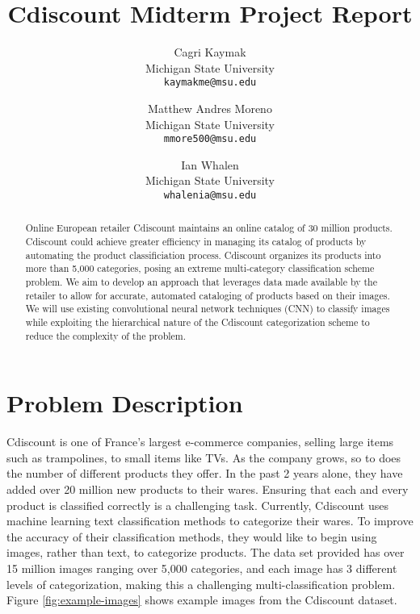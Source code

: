 \documentclass[10pt,twocolumn,letterpaper]{article}
\begin{document}
\title{Cdiscount Midterm Project Report}

\author{Cagri Kaymak\\
Michigan State University \\
{\tt\small kaymakme@msu.edu}
\and
Matthew Andres Moreno\\
Michigan State University\\
{\tt\small mmore500@msu.edu}
\and
Ian Whalen\\
Michigan State University \\
{\tt\small whalenia@msu.edu}
}


\maketitle

\begin{abstract}
Online European retailer Cdiscount maintains an online catalog of 30 million products.
Cdiscount could achieve greater efficiency in managing its catalog of products by automating the product classificiation process. 
Cdiscount organizes its products into more than 5,000 categories, posing an extreme multi-category classification scheme problem.
We aim to develop an approach that leverages data made available by the retailer to allow for accurate, automated cataloging of products based on their images.
We will use existing convolutional neural network techniques (CNN) to classify images while exploiting the hierarchical nature of the Cdiscount categorization scheme to reduce the complexity of the problem.
\end{abstract}

\section{Problem Description}


Cdiscount is one of France's largest e-commerce companies, selling large items such as trampolines, to small items like TVs.
As the company grows, so to does the number of different products they offer.
In the past 2 years alone, they have added over 20 million new products to their wares\cite{cDiscountKaggle}. 
Ensuring that each and every product is classified correctly is a challenging task.
Currently, Cdiscount uses machine learning text classification methods to categorize their wares.
To improve the accuracy of their classification methods, they would like to begin using images, rather than text, to categorize products.
The data set provided has over 15 million images ranging over 5,000 categories, and each image has 3 different levels of categorization, making this a challenging multi-classification problem.
Figure \ref{fig:example-images} shows example images from the Cdiscount dataset. 
\end{document}
